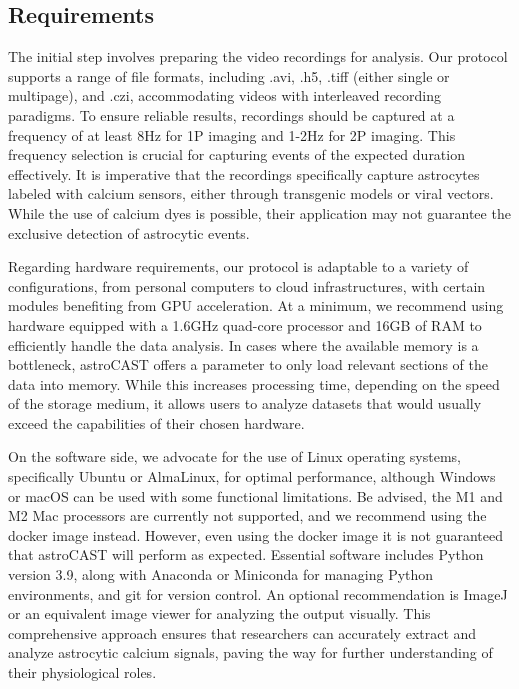 
\subsection{Requirements}
The initial step involves preparing the video recordings for analysis. Our protocol supports a range of file formats, including .avi, .h5, .tiff (either single or multipage), and .czi, accommodating videos with interleaved recording paradigms. To ensure reliable results, recordings should be captured at a frequency of at least 8Hz for \ac{1P} imaging and 1-2Hz for \ac{2P} imaging. This frequency selection is crucial for capturing events of the expected duration effectively. It is imperative that the recordings specifically capture astrocytes labeled with calcium sensors, either through transgenic models or viral vectors. While the use of calcium dyes is possible, their application may not guarantee the exclusive detection of astrocytic events.

Regarding hardware requirements, our protocol is adaptable to a variety of configurations, from personal computers to cloud infrastructures, with certain modules benefiting from GPU acceleration. At a minimum, we recommend using hardware equipped with a 1.6GHz quad-core processor and 16GB of RAM to efficiently handle the data analysis. In cases where the available memory is a bottleneck, astroCAST offers a  parameter to only load relevant sections of the data into memory. While this increases processing time, depending on the speed of the storage medium, it allows users to analyze datasets that would usually exceed the capabilities of their chosen hardware.

On the software side, we advocate for the use of Linux operating systems, specifically Ubuntu or AlmaLinux, for optimal performance, although Windows or macOS can be used with some functional limitations. Be advised, the M1 and M2 Mac processors are currently not supported, and we recommend using the docker image instead. However, even using the docker image it is not guaranteed that astroCAST will perform as expected. Essential software includes Python version 3.9, along with Anaconda or Miniconda for managing Python environments, and git for version control. An optional recommendation is ImageJ or an equivalent image viewer for analyzing the output visually. This comprehensive approach ensures that researchers can accurately extract and analyze astrocytic calcium signals, paving the way for further understanding of their physiological roles.

